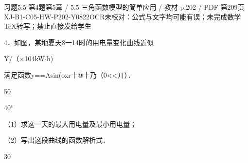 \begin{bankitem}{习题5.5 第4题}{第5章 / 5.5 三角函数模型的简单应用 / 教材 p.202 / PDF 第209页}{XJ-B1-C05-HW-P202-Y0822}{OCR未校对：公式与文字均可能有误；未完成数学TeX转写；禁止直接发给学生}
\begin{ocrdraft}
\par
4．如图，某地夏天8一14时的用电量变化曲线近似
\par
Y/（\ensuremath{\times}104kW\ensuremath{\cdot}h)
\par
满足函数y==Asin(oxr十@十乃（0<<丌）．
\par
50
\par
40“
\par
（1）求这一天的最大用电量及最小用电量；
\par
（2）写出这段曲线的函数解析式．
\par
30
\end{ocrdraft}
\end{bankitem}
